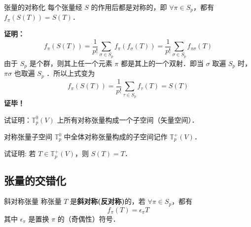\begin{theorem}{张量的对称化}
每个张量经 $S$ 的作用后都是对称的，即 $\forall \pi\in S_p$，都有 $f_\pi(S(T))=S(T)$．
\end{theorem}
\textbf{证明：}
\begin{equation}
f_\pi(S(T))=\frac{1}{p!}\sum_{\sigma\in S_p} f_\pi(f_\sigma(T))=\frac{1}{p!}\sum_{\sigma\in S_p} f_{\pi\sigma}(T)
\end{equation}
由于 $S_p$ 是个群，则其上任一个元素 $\pi$ 都是其上的一个双射．即当 $\sigma$ 取遍 $S_p$ 时，$\pi\sigma$ 也取遍 $S_p$ ．所以上式变为
\begin{equation}
f_\pi(S(T))=\frac{1}{p!}\sum_{\tau\in S_p} f_{\tau}(T)=S(T)
\end{equation}
\textbf{证毕！}

\begin{exercise}{}
试证明：$\mathbb{T}_p^0(V)$ 上所有对称张量构成一个子空间（矢量空间）．
\end{exercise}
\begin{definition}{对称张量子空间}
$\mathbb{T}_p^0$ 中全体对称张量构成的子空间记作 $\mathbb{T}_p^+(V)$．
\end{definition}
\begin{exercise}{}
试证明: 若 $T\in\mathbb{T}_p^+(V)$，则 $S(T)=T$．
\end{exercise}
\subsection{张量的交错化}
\begin{definition}{斜对称张量}
称张量 $T$ 是\textbf{斜对称(反对称)}的，若 $\forall \pi\in S_p$，都有
\begin{equation}\label{SIofTe_eq4}
f_\pi(T)=\epsilon_\pi T
\end{equation}
其中 $\epsilon_\pi$ 是置换 $\pi$ 的（奇偶性）符号．
\end{definition}

